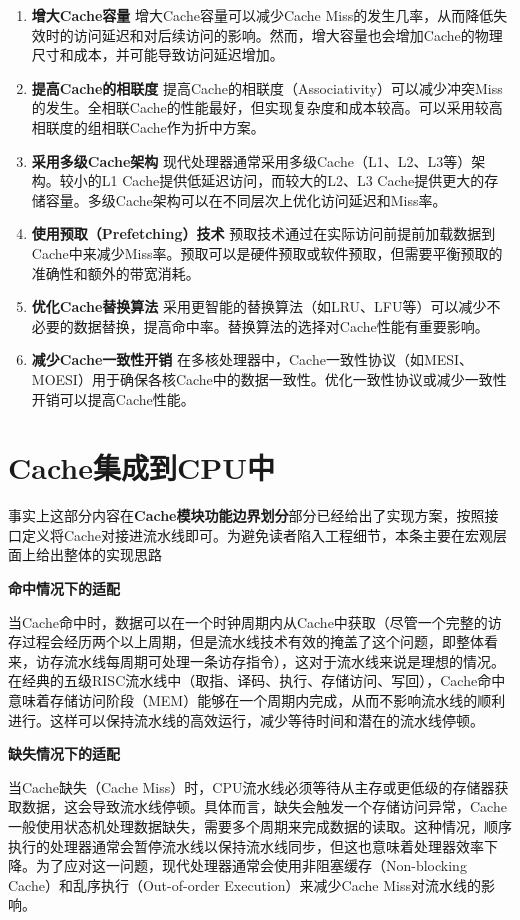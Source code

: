\begin{enumerate}
\def\labelenumi{\arabic{enumi}.}
\item
  \textbf{增大Cache容量}
  增大Cache容量可以减少Cache Miss的发生几率，从而降低失效时的访问延迟和对后续访问的影响。然而，增大容量也会增加Cache的物理尺寸和成本，并可能导致访问延迟增加。
\item
  \textbf{提高Cache的相联度}
  提高Cache的相联度（Associativity）可以减少冲突Miss的发生。全相联Cache的性能最好，但实现复杂度和成本较高。可以采用较高相联度的组相联Cache作为折中方案。
\item
  \textbf{采用多级Cache架构}
  现代处理器通常采用多级Cache（L1、L2、L3等）架构。较小的L1 Cache提供低延迟访问，而较大的L2、L3 Cache提供更大的存储容量。多级Cache架构可以在不同层次上优化访问延迟和Miss率。
\item
  \textbf{使用预取（Prefetching）技术}
  预取技术通过在实际访问前提前加载数据到Cache中来减少Miss率。预取可以是硬件预取或软件预取，但需要平衡预取的准确性和额外的带宽消耗。
\item
  \textbf{优化Cache替换算法}
  采用更智能的替换算法（如LRU、LFU等）可以减少不必要的数据替换，提高命中率。替换算法的选择对Cache性能有重要影响。
\item
  \textbf{减少Cache一致性开销}
  在多核处理器中，Cache一致性协议（如MESI、MOESI）用于确保各核Cache中的数据一致性。优化一致性协议或减少一致性开销可以提高Cache性能。
\end{enumerate}

\section{Cache集成到CPU中}\label{sec:09-cache-021}

事实上这部分内容在\textbf{Cache模块功能边界划分}部分已经给出了实现方案，按照接口定义将Cache对接进流水线即可。为避免读者陷入工程细节，本条主要在宏观层面上给出整体的实现思路

\textbf{命中情况下的适配}

当Cache命中时，数据可以在一个时钟周期内从Cache中获取（尽管一个完整的访存过程会经历两个以上周期，但是流水线技术有效的掩盖了这个问题，即整体看来，访存流水线每周期可处理一条访存指令），这对于流水线来说是理想的情况。在经典的五级RISC流水线中（取指、译码、执行、存储访问、写回），Cache命中意味着存储访问阶段（MEM）能够在一个周期内完成，从而不影响流水线的顺利进行。这样可以保持流水线的高效运行，减少等待时间和潜在的流水线停顿。

\textbf{缺失情况下的适配}

当Cache缺失（Cache Miss）时，CPU流水线必须等待从主存或更低级的存储器获取数据，这会导致流水线停顿。具体而言，缺失会触发一个存储访问异常，Cache一般使用状态机处理数据缺失，需要多个周期来完成数据的读取。这种情况，顺序执行的处理器通常会暂停流水线以保持流水线同步，但这也意味着处理器效率下降。为了应对这一问题，现代处理器通常会使用非阻塞缓存（Non-blocking Cache）和乱序执行（Out-of-order Execution）来减少Cache Miss对流水线的影响。

